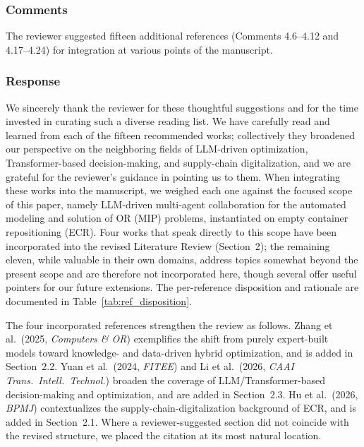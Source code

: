 \documentclass[11pt,a4paper]{article}
\begin{document}
\subsubsection{Comments}
The reviewer suggested fifteen additional references (Comments 4.6--4.12 and 4.17--4.24) for integration at various points of the manuscript.

\subsubsection{Response}
We sincerely thank the reviewer for these thoughtful suggestions and for the time invested in curating such a diverse reading list. We have carefully read and learned from each of the fifteen recommended works; collectively they broadened our perspective on the neighboring fields of LLM-driven optimization, Transformer-based decision-making, and supply-chain digitalization, and we are grateful for the reviewer's guidance in pointing us to them. When integrating these works into the manuscript, we weighed each one against the focused scope of this paper, namely LLM-driven multi-agent collaboration for the automated modeling and solution of OR (MIP) problems, instantiated on empty container repositioning (ECR). Four works that speak directly to this scope have been incorporated into the revised Literature Review (Section~2); the remaining eleven, while valuable in their own domains, address topics somewhat beyond the present scope and are therefore not incorporated here, though several offer useful pointers for our future extensions. The per-reference disposition and rationale are documented in Table~\ref{tab:ref_disposition}.

The four incorporated references strengthen the review as follows. Zhang et al.\ (2025, \emph{Computers \& OR}) exemplifies the shift from purely expert-built models toward knowledge- and data-driven hybrid optimization, and is added in Section~2.2. Yuan et al.\ (2024, \emph{FITEE}) and Li et al.\ (2026, \emph{CAAI Trans.\ Intell.\ Technol.}) broaden the coverage of LLM/Transformer-based decision-making and optimization, and are added in Section~2.3. Hu et al.\ (2026, \emph{BPMJ}) contextualizes the supply-chain-digitalization background of ECR, and is added in Section~2.1. Where a reviewer-suggested section did not coincide with the revised structure, we placed the citation at its most natural location.
\end{document}
